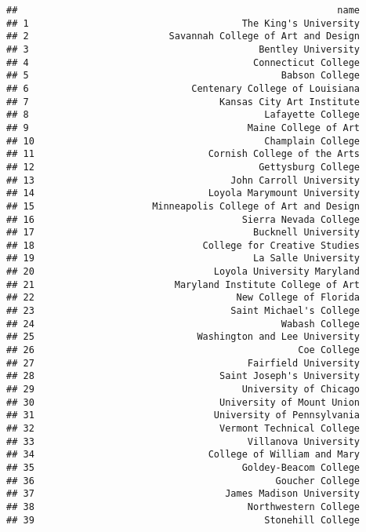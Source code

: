 \documentclass[
]{article}
\begin{document}
\begin{verbatim}
##                                                         name
## 1                                      The King's University
## 2                         Savannah College of Art and Design
## 3                                         Bentley University
## 4                                        Connecticut College
## 5                                             Babson College
## 6                             Centenary College of Louisiana
## 7                                  Kansas City Art Institute
## 8                                          Lafayette College
## 9                                       Maine College of Art
## 10                                         Champlain College
## 11                               Cornish College of the Arts
## 12                                        Gettysburg College
## 13                                   John Carroll University
## 14                               Loyola Marymount University
## 15                     Minneapolis College of Art and Design
## 16                                     Sierra Nevada College
## 17                                       Bucknell University
## 18                              College for Creative Studies
## 19                                       La Salle University
## 20                                Loyola University Maryland
## 21                         Maryland Institute College of Art
## 22                                    New College of Florida
## 23                                   Saint Michael's College
## 24                                            Wabash College
## 25                             Washington and Lee University
## 26                                               Coe College
## 27                                      Fairfield University
## 28                                 Saint Joseph's University
## 29                                     University of Chicago
## 30                                 University of Mount Union
## 31                                University of Pennsylvania
## 32                                 Vermont Technical College
## 33                                      Villanova University
## 34                               College of William and Mary
## 35                                     Goldey-Beacom College
## 36                                           Goucher College
## 37                                  James Madison University
## 38                                      Northwestern College
## 39                                         Stonehill College

\end{verbatim}
\end{document}
